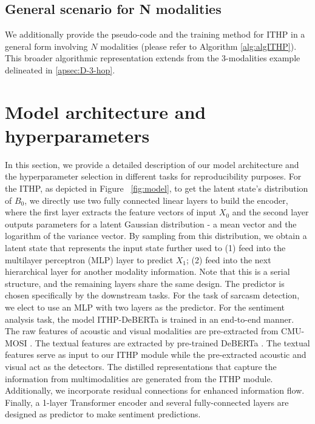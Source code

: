 \documentclass{article} %
\begin{document}



\subsection{General scenario for N modalities}
\label{apsec:D-general-scenario}
We additionally provide the pseudo-code and the training method for ITHP in a general form involving $N$ modalities (please refer to Algorithm \ref{alg:algITHP}). This broader algorithmic representation extends from the 3-modalities example delineated in \ref{apsec:D-3-hop}.






\section{Model architecture and hyperparameters}
\label{apsec:model_archi}

% 

In this section, we provide a detailed description of our model architecture and the hyperparameter selection in different tasks for reproducibility purposes. For the ITHP, as depicted in Figure ~\ref{fig:model}, to get the latent state's distribution of $B_0$, we directly use two fully connected linear layers to build the encoder, where the first layer extracts the feature vectors of input $X_0$ and the second layer outputs parameters for a latent Gaussian distribution - a mean vector and the logarithm of the variance vector. By sampling from this distribution, we obtain a latent state that represents the input state further used to (1) feed into the multilayer perceptron (MLP) layer to predict $X_1$; (2) feed into the next hierarchical layer for another modality information. Note that this is a serial structure, and the remaining layers share the same design. The predictor is chosen specifically by the downstream tasks. For the task of sarcasm detection, we elect to use an MLP with two layers as the predictor. For the sentiment analysis task, the model ITHP-DeBERTa is trained in an end-to-end manner. The raw features of acoustic and visual modalities are pre-extracted from CMU-MOSI \citep{zadeh2016mosi}. The textual features are extracted by pre-trained DeBERTa \citep{he2020deberta, he2021debertav3}. The textual features serve as input to our ITHP module while the pre-extracted acoustic and visual act as the detectors. The distilled representations that capture the information from multimodalities are generated from the ITHP module. Additionally, we incorporate residual connections for enhanced information flow. Finally, a 1-layer Transformer encoder and several fully-connected layers are designed as predictor to make sentiment predictions.
\end{document}
